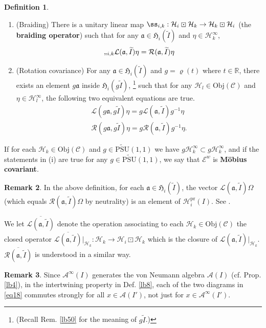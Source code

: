 \documentclass[11pt,b5paper,notitlepage]{article}
\theoremstyle{definition}
\newtheorem{df}{Definition}[section]
\newtheorem{rem}[df]{Remark}
\theoremstyle{plain}
\newcommand{\fk}{\mathfrak}
\newcommand{\mc}{\mathcal}
\newcommand{\wtd}{\widetilde}
\newcommand{\ovl}{\overline}
\newcommand{\scr}{\mathscr}
\newcommand{\mbb}{\mathbb}
\newcommand{\pr}{\mathrm {pr}}
\newcommand{\UPSU}{\widetilde{\mathrm{PSU}}(1,1)}
\newcommand{\Obj}{\mathrm{Obj}}
\numberwithin{equation}{section}
\begin{document}
\begin{df}
\begin{enumerate}[label=(\alph*)]
\item (Braiding) There is a unitary linear map $\ss_{i,k}:\mc H_i\boxdot\mc H_k\rightarrow\mc H_k\boxdot \mc H_i$ (the \textbf{braiding operator}) such that for any  $\fk a\in\fk H_i(\wtd I)$ and $\eta\in\mc H_k^\infty$,
	\begin{align}
	\ss_{i,k} \mc L(\fk a,\wtd I)\eta=\mc R(\fk a,\wtd I)\eta
	\end{align}
	
\item (Rotation covariance) 	For any $\fk a\in\fk H_i(\wtd I)$ and $g=\varrho(t)$ where $t\in\mbb R$, there exists an element $g\fk a$ inside $\fk H_i(g\wtd I)$, \footnote{(Recall Rem. \ref{lb50} for the meaning of $g\wtd I$.)} such that for any $\mc H_l\in\Obj(\scr C)$ and $\eta\in\mc H_l^\infty$, the following two equivalent equations are true.
\begin{subequations}
	\begin{gather}
	\mc L(g\fk a,g\wtd I)\eta=g\mc L(\fk a,\wtd I)g^{-1}\eta\\
	\mc R(g\fk a,g\wtd I)\eta=g\mc R(\fk a,\wtd I)g^{-1}\eta.
	\end{gather}
\end{subequations}
\end{enumerate}
If for each $\mc H_k\in\Obj(\scr C)$ and $g\in\UPSU$ we have $g\mc H_k^\infty\subset g\mc H_k^\infty$, and if the statements in (i) are true for any $g\in\UPSU$, we say that $\scr E^w$ is \textbf{M\"obius covariant}.
\end{df}

\begin{rem}\label{lb6}
In the above definition, for each $\fk a\in\fk H_i(\wtd I)$, the vector $\mc L(\fk a,\wtd I)\Omega$ (which equals $\mc R(\fk a,\wtd I)\Omega$ by neutrality) is an element of $\mc H_i^\pr(I)$. See \cite[Prop. 1.4.5]{Gui20}.
\end{rem}


We let $\ovl{\mc L(\fk a,\wtd I)}$ denote the operation associating to each $\mc H_k\in\Obj(\scr C)$ the closed operator $\ovl{\mc L(\fk a,\wtd I)}|_{\mc H_k}:\mc H_k\rightarrow\mc H_i\boxdot\mc H_k$ which is the closure of $\mc L(\fk a,\wtd I)|_{\mc H_k}$. $\ovl{\mc R(\fk a,\wtd I)}$ is understood in a similar way.

\begin{rem}
Since $\mc A^\infty(I)$ generates the von Neumann algebra $\mc A(I)$ (cf. Prop. \ref{lb4}), in the intertwining property in Def. \ref{lb8}, each of the two diagrams in \eqref{eq18} commutes strongly for all $x\in\mc A(I')$, not just for $x\in\mc A^\infty(I')$.
\end{rem}
\end{document}
